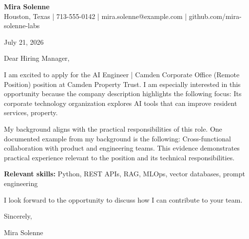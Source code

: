 \documentclass[11pt]{article}
\begin{document}
\begin{center}
{\Large\bfseries Mira Solenne}\\
Houston, Texas | 713-555-0142 | mira.solenne@example.com | github.com/mira-solenne-labs
\end{center}

July 21, 2026

Dear Hiring Manager,

I am excited to apply for the AI Engineer | Camden Corporate Office (Remote Position) position at Camden Property Trust. I am especially interested in this opportunity because the company description highlights the following focus: Its corporate technology organization explores AI tools that can improve resident services, property.

My background aligns with the practical responsibilities of this role. One documented example from my background is the following: Cross-functional collaboration with product and engineering teams. This evidence demonstrates practical experience relevant to the position and its technical responsibilities.

\textbf{Relevant skills:} Python, REST APIs, RAG, MLOps, vector databases, prompt engineering

I look forward to the opportunity to discuss how I can contribute to your team.

Sincerely,

Mira Solenne
\end{document}
